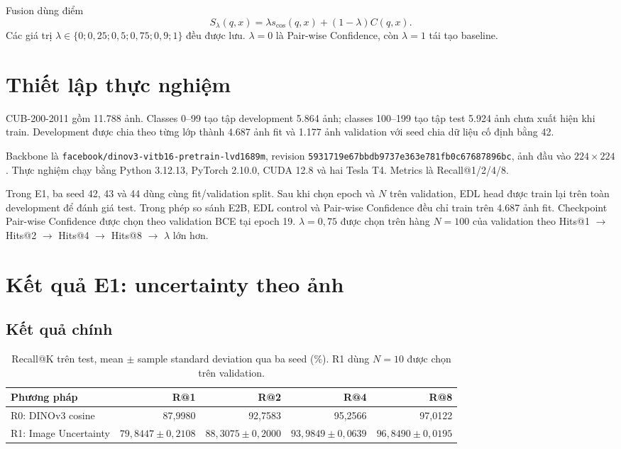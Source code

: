 \documentclass[11pt,a4paper]{article}
\begin{document}
Fusion dùng điểm
\begin{equation}
 S_{\lambda}(q,x)=\lambda s_{\cos}(q,x)+(1-\lambda)C(q,x).
\end{equation}
Các giá trị $\lambda\in\{0;0{,}25;0{,}5;0{,}75;0{,}9;1\}$ đều được lưu.
$\lambda=0$ là Pair-wise Confidence, còn $\lambda=1$ tái tạo baseline.

\section{Thiết lập thực nghiệm}
CUB-200-2011 gồm 11.788 ảnh. Classes 0--99 tạo tập development 5.864 ảnh;
classes 100--199 tạo tập test 5.924 ảnh chưa xuất hiện khi train. Development
được chia theo từng lớp thành 4.687 ảnh fit và 1.177 ảnh validation với seed
chia dữ liệu cố định bằng 42.

Backbone là \texttt{facebook/dinov3-vitb16-pretrain-lvd1689m}, revision
\texttt{5931719e67bbdb9737e363e781fb0c67687896bc}, ảnh đầu vào
$224\times224$. Thực nghiệm chạy bằng Python 3.12.13, PyTorch 2.10.0,
CUDA 12.8 và hai Tesla T4. Metrics là Recall@1/2/4/8.

Trong E1, ba seed 42, 43 và 44 dùng cùng fit/validation split. Sau khi chọn
epoch và $N$ trên validation, EDL head được train lại trên toàn development để
đánh giá test. Trong phép so sánh E2B, EDL control và Pair-wise Confidence đều
chỉ train trên 4.687 ảnh fit. Checkpoint Pair-wise Confidence được chọn theo
validation BCE tại epoch 19. $\lambda=0{,}75$ được chọn trên hàng $N=100$ của
validation theo Hits@1 $\rightarrow$ Hits@2 $\rightarrow$ Hits@4
$\rightarrow$ Hits@8 $\rightarrow$ $\lambda$ lớn hơn.

\section{Kết quả E1: uncertainty theo ảnh}
\subsection{Kết quả chính}
\begin{table}[H]
\centering
\caption{Recall@K trên test, mean $\pm$ sample standard deviation qua ba seed
(\%). R1 dùng $N=10$ được chọn trên validation.}
\begin{tabular}{@{}lrrrr@{}}
\toprule
Phương pháp & R@1 & R@2 & R@4 & R@8\\ \midrule
R0: DINOv3 cosine & 87,9980 & 92,7583 & 95,2566 & 97,0122\\
R1: Image Uncertainty
& $79,8447\pm0,2108$ & $88,3075\pm0,2000$
& $93,9849\pm0,0639$ & $96,8490\pm0,0195$\\
\bottomrule
\end{tabular}
\end{table}
\end{document}
